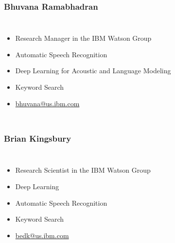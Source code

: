 \begin{frame}
  \frametitle{Bhuvana Ramabhadran}
  \begin{columns}[T]
    \column{2in}
    \begin{itemize}
    \item Research Manager in the IBM Watson Group
    \item Automatic Speech Recognition
    \item Deep Learning for Acoustic and Language Modeling
    \item Keyword Search
    \item \href{mailto:bhuvana@us.ibm.com}{bhuvana@us.ibm.com}
    \end{itemize}
    \column{2in}
  \end{columns}
\end{frame}

\begin{frame}
  \frametitle{Brian Kingsbury}
  \begin{columns}[T]
    \column{2in}
    \begin{itemize}
    \item Research Scientist in the IBM Watson Group
    \item Deep Learning
    \item Automatic Speech Recognition
    \item Keyword Search
    \item \href{mailto:bedk@us.ibm.com}{bedk@us.ibm.com}
    \end{itemize}
    \column{2in}
  \end{columns}
\end{frame}
